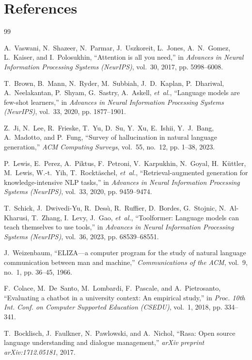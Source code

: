 \documentclass[12pt,a4paper]{report}
\begin{document}
\section{References}
\begin{thebibliography}{99}

A.~Vaswani, N.~Shazeer, N.~Parmar, J.~Uszkoreit, L.~Jones, A.~N.~Gomez, L.~Kaiser, and I.~Polosukhin, ``Attention is all you need,'' in \emph{Advances in Neural Information Processing Systems (NeurIPS)}, vol.~30, 2017, pp. 5998--6008.

T.~Brown, B.~Mann, N.~Ryder, M.~Subbiah, J.~D.~Kaplan, P.~Dhariwal, A.~Neelakantan, P.~Shyam, G.~Sastry, A.~Askell, \emph{et~al.}, ``Language models are few-shot learners,'' in \emph{Advances in Neural Information Processing Systems (NeurIPS)}, vol.~33, 2020, pp. 1877--1901.

Z.~Ji, N.~Lee, R.~Frieske, T.~Yu, D.~Su, Y.~Xu, E.~Ishii, Y.~J.~Bang, A.~Madotto, and P.~Fung, ``Survey of hallucination in natural language generation,'' \emph{ACM Computing Surveys}, vol.~55, no.~12, pp. 1--38, 2023.

P.~Lewis, E.~Perez, A.~Piktus, F.~Petroni, V.~Karpukhin, N.~Goyal, H.~K{\"u}ttler, M.~Lewis, W.-t.~Yih, T.~Rockt{\"a}schel, \emph{et~al.}, ``Retrieval-augmented generation for knowledge-intensive NLP tasks,'' in \emph{Advances in Neural Information Processing Systems (NeurIPS)}, vol.~33, 2020, pp. 9459--9474.

T.~Schick, J.~Dwivedi-Yu, R.~Dess{\`\i}, R.~Ruffier, D.~Bordes, G.~Stojnic, N.~Al-Kharusi, T.~Zhang, I.~Levy, J.~Gao, \emph{et~al.}, ``Toolformer: Language models can teach themselves to use tools,'' in \emph{Advances in Neural Information Processing Systems (NeurIPS)}, vol.~36, 2023, pp. 68539--68551.

J.~Weizenbaum, ``ELIZA---a computer program for the study of natural language communication between man and machine,'' \emph{Communications of the ACM}, vol.~9, no.~1, pp. 36--45, 1966.

F.~Colace, M.~De~Santo, M.~Lombardi, F.~Pascale, and A.~Pietrosanto, ``Evaluating a chatbot in a university context: An empirical study,'' in \emph{Proc. 10th Int. Conf. on Computer Supported Education (CSEDU)}, vol.~1, 2018, pp. 334--341.

T.~Bocklisch, J.~Faulkner, N.~Pawlowski, and A.~Nichol, ``Rasa: Open source language understanding and dialogue management,'' \emph{arXiv preprint arXiv:1712.05181}, 2017.


\end{thebibliography}
\end{document}
